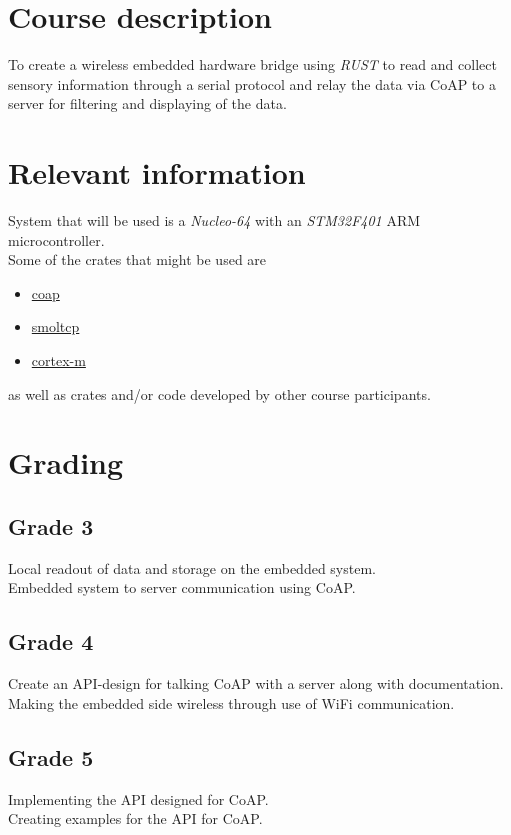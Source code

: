 \newpage
\section*{Course description}

To create a wireless embedded hardware bridge using \emph{RUST} to read and collect sensory information through a serial protocol and relay the data via CoAP to a server for filtering and displaying of the data. 

\section*{Relevant information}
System that will be used is a \emph{Nucleo-64} with an \emph{STM32F401} ARM microcontroller. \\ 
Some of the crates that might be used are 
\begin{itemize}
\item \href{https://crates.io/crates/coap}{coap}
\item  \href{https://crates.io/crates/smoltcp}{smoltcp}
\item  \href{https://crates.io/crates/cortex-m}{cortex-m}
\end{itemize}
as well as crates and/or code developed by other course participants.

\section*{Grading}

\subsection*{Grade 3}
Local readout of data and storage on the embedded system.\\
Embedded system to server communication using CoAP.

\subsection*{Grade 4}
Create an API-design for talking CoAP with a server along with documentation.\\
Making the embedded side wireless through use of WiFi communication.

\subsection*{Grade 5}
Implementing the API designed for CoAP. \\
Creating examples for the API for CoAP. 